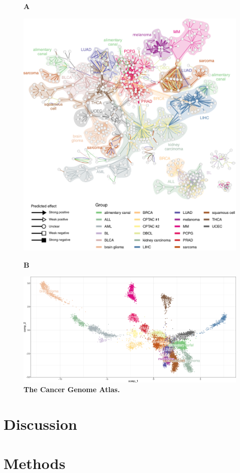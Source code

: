 \begin{figure}[htb!]
	{\raggedright\textbf{A}}
	\begin{center}\includegraphics[width=.85\linewidth]{fig/tcga/grouped_interactions.pdf}\end{center}
	{\raggedright\textbf{B}}
	\begin{center}\includegraphics[width=.8\linewidth]{fig/tcga/plot_fr_cropped.png}\end{center}
	\caption{
		\textbf{The Cancer Genome Atlas.}
	}
	\label{fig:tcga}
\end{figure}


\section{Discussion}

\section{Methods}

